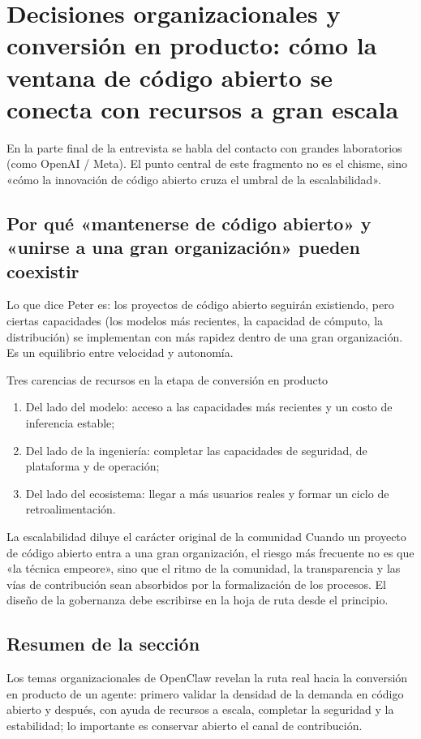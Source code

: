 \section{Decisiones organizacionales y conversión en producto: cómo la ventana de código abierto se conecta con recursos a gran escala}

En la parte final de la entrevista se habla del contacto con grandes laboratorios (como OpenAI / Meta). El punto central de este fragmento no es el chisme, sino «cómo la innovación de código abierto cruza el umbral de la escalabilidad».

\subsection{Por qué «mantenerse de código abierto» y «unirse a una gran organización» pueden coexistir}

Lo que dice Peter es: los proyectos de código abierto seguirán existiendo, pero ciertas capacidades (los modelos más recientes, la capacidad de cómputo, la distribución) se implementan con más rapidez dentro de una gran organización. Es un equilibrio entre velocidad y autonomía.

\begin{importantbox}{Tres carencias de recursos en la etapa de conversión en producto}
\begin{enumerate}
    \item Del lado del modelo: acceso a las capacidades más recientes y un costo de inferencia estable;
    \item Del lado de la ingeniería: completar las capacidades de seguridad, de plataforma y de operación;
    \item Del lado del ecosistema: llegar a más usuarios reales y formar un ciclo de retroalimentación.
\end{enumerate}
\end{importantbox}

\begin{warningbox}{La escalabilidad diluye el carácter original de la comunidad}
Cuando un proyecto de código abierto entra a una gran organización, el riesgo más frecuente no es que «la técnica empeore», sino que el ritmo de la comunidad, la transparencia y las vías de contribución sean absorbidos por la formalización de los procesos. El diseño de la gobernanza debe escribirse en la hoja de ruta desde el principio.
\end{warningbox}

\subsection{Resumen de la sección}
Los temas organizacionales de OpenClaw revelan la ruta real hacia la conversión en producto de un agente: primero validar la densidad de la demanda en código abierto y después, con ayuda de recursos a escala, completar la seguridad y la estabilidad; lo importante es conservar abierto el canal de contribución.

